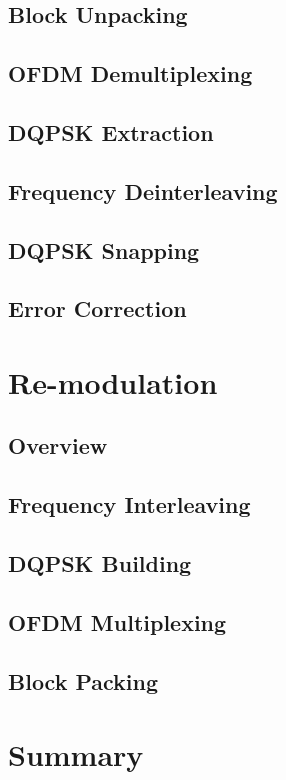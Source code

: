 \documentclass[class=report,11pt,crop=false]{standalone}
\begin{document}
\subsection{Block Unpacking}
\subsection{OFDM Demultiplexing}
\subsection{DQPSK Extraction}
\subsection{Frequency Deinterleaving}
\subsection{DQPSK Snapping}
\subsection{Error Correction}

\section{Re-modulation}
\subsection{Overview}
\subsection{Frequency Interleaving}
\subsection{DQPSK Building}
\subsection{OFDM Multiplexing}
\subsection{Block Packing}

\section{Summary}

\ifstandalone

\printnoidxglossary[type=\acronymtype,nonumberlist]
\fi
\end{document}
